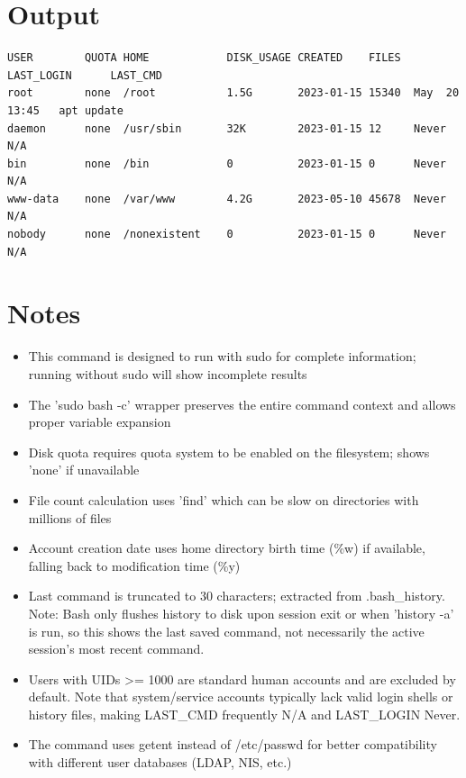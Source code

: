 \documentclass[openany]{book}
\begin{document}
\begin{enumerate}
\end{enumerate}

\section*{Output}
\begin{lstlisting}
USER        QUOTA HOME            DISK_USAGE CREATED    FILES  LAST_LOGIN      LAST_CMD
root        none  /root           1.5G       2023-01-15 15340  May  20 13:45   apt update
daemon      none  /usr/sbin       32K        2023-01-15 12     Never           N/A
bin         none  /bin            0          2023-01-15 0      Never           N/A
www-data    none  /var/www        4.2G       2023-05-10 45678  Never           N/A
nobody      none  /nonexistent    0          2023-01-15 0      Never           N/A
\end{lstlisting}

\section*{Notes}
\begin{itemize}
  \item This command is designed to run with sudo for complete information; running without sudo will show incomplete results
  \item The 'sudo bash -c' wrapper preserves the entire command context and allows proper variable expansion
  \item Disk quota requires quota system to be enabled on the filesystem; shows 'none' if unavailable
  \item File count calculation uses 'find' which can be slow on directories with millions of files
  \item Account creation date uses home directory birth time (\%w) if available, falling back to modification time (\%y)
  \item Last command is truncated to 30 characters; extracted from .bash\_history. Note: Bash only flushes history to disk upon session exit or when 'history -a' is run, so this shows the last saved command, not necessarily the active session's most recent command.
  \item Users with UIDs >= 1000 are standard human accounts and are excluded by default. Note that system/service accounts typically lack valid login shells or history files, making LAST\_CMD frequently N/A and LAST\_LOGIN Never.
  \item The command uses getent instead of /etc/passwd for better compatibility with different user databases (LDAP, NIS, etc.)
\end{itemize}
\end{document}
